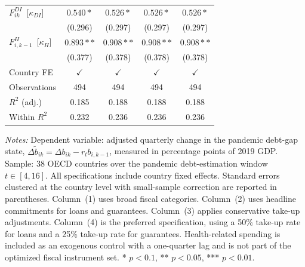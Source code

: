 \begin{table}[H]
\begin{tabular}{@{} l c c c c @{}}
$F^{DI}_{ik}$ \,[$\kappa_{DI}$] & $0.540*$ & $0.526*$ & $0.526*$ & $0.526*$ \\
 & (0.296) & (0.297) & (0.297) & (0.297) \\[4pt]
$F^{H}_{i,k-1}$ \,[$\kappa_H$] & $0.893**$ & $0.908**$ & $0.908**$ & $0.908**$ \\
 & (0.377) & (0.378) & (0.378) & (0.378) \\[4pt]
\midrule
Country FE & $\checkmark$ & $\checkmark$ & $\checkmark$ & $\checkmark$ \\
Observations & 494 & 494 & 494 & 494 \\
$R^2$ (adj.) & 0.185 & 0.188 & 0.188 & 0.188 \\
Within $R^2$ & 0.232 & 0.236 & 0.236 & 0.236 \\
\bottomrule
\end{tabular}
\vspace{4pt}
\parbox{\textwidth}{\scriptsize\textit{Notes:} Dependent variable: adjusted quarterly change in the pandemic debt-gap state, $\Delta \tilde b_{ik}=\Delta b_{ik}-r_t b_{i,k-1}$, measured in percentage points of 2019 GDP. Sample: 38 OECD countries over the pandemic debt-estimation window $t \in [4,16]$. All specifications include country fixed effects. Standard errors clustered at the country level with small-sample correction are reported in parentheses. Column~(1) uses broad fiscal categories. Column~(2) uses headline commitments for loans and guarantees. Column~(3) applies conservative take-up adjustments. Column~(4) is the preferred specification, using a 50\% take-up rate for loans and a 25\% take-up rate for guarantees. Health-related spending is included as an exogenous control with a one-quarter lag and is not part of the optimized fiscal instrument set. * $p<0.1$, ** $p<0.05$, *** $p<0.01$.}
\end{table}
